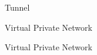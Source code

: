 \documentclass{beamer}
\begin{document}
  {
    \begin{frame}{Tunnel}
    \end{frame}
  }
  {
    \begin{frame}{Virtual Private Network}
    \end{frame}
  }
  {
    \begin{frame}{Virtual Private Network}
    \end{frame}
  }
\end{document}
